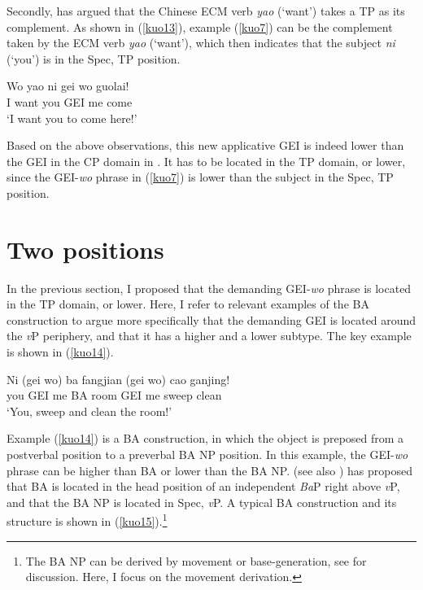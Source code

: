 \documentclass[output=paper,colorlinks,citecolor=brown]{langscibook}
\begin{document}
Secondly, \citet{Li1990} has argued that the Chinese ECM verb \textit{yao} (`want') takes a TP as its complement. As shown in (\ref{kuo13}), example (\ref{kuo7}) can be the complement taken by the ECM verb \textit{yao} (`want'), which then indicates that the subject \textit{ni} (`you') is in the Spec, TP position. 

\ea
\label{kuo13}
\gll Wo yao     ni gei wo  guolai!\\  
     I  want    you GEI me  come\\ 
\glt `I want you to come here!'
\z

Based on the above observations, this new applicative GEI is indeed lower than the GEI in the CP domain in \citet{Tsai2017}. It has to be located in the TP domain, or lower, since the GEI-\textit{wo} phrase in (\ref{kuo7}) is lower than the subject in the Spec, TP position.

\section{Two positions}\label{sect3}

In the previous section, I proposed that the demanding GEI-\textit{wo} phrase is located in the TP domain, or lower. Here, I refer to relevant examples of the BA construction to argue more specifically that the demanding GEI is located around the \textit{v}P periphery, and that it has a higher and a lower subtype. The key example is shown in (\ref{kuo14}).

\ea
\label{kuo14}
\gll Ni     (gei wo)    ba  fangjian    (gei wo)    cao     ganjing!\\  
     you     GEI me     BA  room         GEI me     sweep   clean  \\ 
\glt `You, sweep and clean the room!'
\z

Example (\ref{kuo14}) is a BA construction, in which the object is preposed from a postverbal position to a preverbal BA NP position. In this example, the GEI-\textit{wo} phrase can be higher than BA or lower than the BA NP. \citet{Li2006} (see also \citealt{Haugnlili2009}) has proposed that BA is located in the head position of an independent \textit{Ba}P right above \textit{v}P, and that the BA NP is located in Spec, \textit{v}P. A typical BA construction and its structure is shown in (\ref{kuo15}).\footnote{The BA NP can be derived by movement or base-generation, see \citet{Li1&Thompson} for discussion. Here, I focus on the movement derivation.}

\ea
\label{kuo15}
  \z
\z
\end{document}
